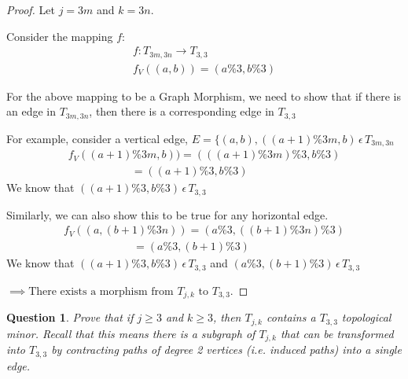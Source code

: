 \documentclass{article}
\newtheorem{question}{Question}
\begin{document}
\begin{proof}
    Let $j = 3m$ and $k = 3n$.
    
    Consider the mapping $f$: \\
    \begin{gather*}
        f: T_{3m, 3n} \rightarrow T_{3,3} \\
        f_V((a, b)) = (a \% 3, b \% 3)
    \end{gather*}
    
    For the above mapping to be a Graph Morphism, we need to show that if there is an edge in $T_{3m,3n}$, then there is a corresponding edge in $T_{3,3}$
   
    For example, consider a vertical edge, $E = \{(a,b), ((a+1)\%3m, b) \hspace{2pt} \epsilon \hspace{2pt} T_{3m, 3n}$
    \begin{gather*}
    f_V((a+1)\%3m, b)) = (((a+1)\%3m)\% 3, b \% 3) \\
    \phantom{xxxxxxxxxx} = ((a+1)\% 3, b \% 3)
    \end{gather*}
    We know that $((a+1)\% 3, b \% 3) \hspace{2pt} \epsilon \hspace{2pt} T_{3, 3}$
    
    Similarly, we can also show this to be true for any horizontal edge. \\
    \begin{gather*}
     f_V((a, (b+1)\%3n)) = (a \% 3, ((b+1)\%3n)\% 3) \\
    \phantom{xxxxxxxxxxx} = (a \% 3, (b+1)\% 3) 
    \end{gather*}
    We know that $((a+1)\% 3, b \% 3) \hspace{2pt} \epsilon \hspace{2pt} T_{3, 3}$ and $(a \% 3, (b+1)\%3) \hspace{2pt} \epsilon \hspace{2pt} T_{3, 3}$
    
    $\implies \text{There exists a morphism from $T_{j,k}$ to $T_{3,3}$}$.

\end{proof}
\pagebreak
\begin{question}
    Prove that if $j\ge 3$ and $k\ge 3$, then $T_{j,k}$ contains a $T_{3,3}$ topological minor.  Recall that this means there is a subgraph of $T_{j,k}$ that can be transformed into $T_{3,3}$ by contracting paths of degree 2 vertices (i.e. induced paths) into a single edge.
\end{question}
\end{document}
